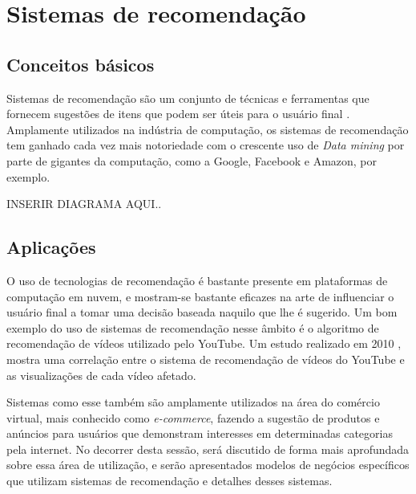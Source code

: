 \documentclass[
	12pt,				%
	openright,			%
	twoside,			%
	a4paper,			%
	english,			%
	french,				%
	spanish,			%
	brazil				%
	]{abntex2}
\begin{document}
\subsection{}


\section{Sistemas de recomendação}\label{sec_recom}


\subsection{Conceitos básicos}

Sistemas de recomendação são um conjunto de técnicas e ferramentas que fornecem sugestões de itens que podem ser úteis para o usuário final \cite{resnick1997recommender} \cite{good1999combining} \cite{burke2007hybrid}. Amplamente utilizados na indústria de computação, os sistemas de recomendação tem ganhado cada vez mais notoriedade com o crescente uso de \emph{Data mining} por parte de gigantes da computação, como a Google, Facebook e Amazon, por exemplo.

INSERIR DIAGRAMA AQUI..



\subsection{Aplicações}

O uso de tecnologias de recomendação é bastante presente em plataformas de computação em nuvem, e mostram-se bastante eficazes na arte de influenciar o usuário final a tomar uma decisão baseada naquilo que lhe é sugerido. Um bom exemplo do uso de sistemas de recomendação nesse âmbito é o algoritmo de recomendação de vídeos utilizado pelo YouTube. Um estudo realizado em 2010 \cite{zhou2010impact}, mostra uma correlação entre o sistema de recomendação de vídeos do YouTube e as visualizações de cada vídeo afetado.

Sistemas como esse também são amplamente utilizados na área do comércio virtual, mais conhecido como \emph{e-commerce}, fazendo a sugestão de produtos e anúncios para usuários que demonstram interesses em determinadas categorias pela internet. No decorrer desta sessão, será discutido de forma mais aprofundada sobre essa área de utilização, e serão apresentados modelos de negócios específicos que utilizam sistemas de recomendação e detalhes desses sistemas.
\end{document}
